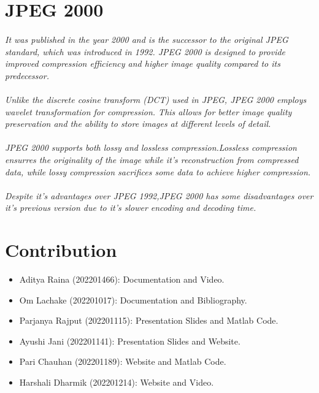 \documentclass[12pt, letterpaper]{article}
\begin{document}
\section{{\color{blue}JPEG 2000}}
\paragraph{}\textit{It was published in the year 2000 and is the successor to the original JPEG standard, which was introduced in 1992. JPEG 2000 is designed to provide improved compression efficiency and higher image quality compared to its predecessor.}
\paragraph{}\textit{ Unlike the discrete cosine transform (DCT) used in JPEG, JPEG 2000 employs wavelet transformation for compression. This allows for better image quality preservation and the ability to store images at different levels of detail.}
\paragraph{}\textit{JPEG 2000 supports both lossy and lossless compression.Lossless compression ensurres the originality of the image while it's reconstruction from compressed data, while lossy compression sacrifices some data to achieve higher compression.}
\paragraph{}\textit{Despite it's advantages over JPEG 1992,JPEG 2000 has some disadvantages over it's previous version due to it's slower encoding and decoding time.}
\section{{\color{blue}Contribution}}
\begin{itemize}
  \item \textup{{\large Aditya Raina (202201466):} Documentation and Video.}
  \item \textup{{\large Om Lachake (202201017):} Documentation and Bibliography.}
  \item \textup{{\large Parjanya Rajput (202201115):} Presentation Slides and Matlab Code.}
  \item \textup{{\large Ayushi Jani (202201141):} Presentation Slides and Website.}
  \item \textup{{\large Pari Chauhan (202201189):} Website and Matlab Code.}
  \item \textup{{\large Harshali Dharmik (202201214):} Website and Video.}

\end{itemize}
\newpage
~\nocite{jaipur,pdf,Penn92,qoura,stanford-dct, reducible2022,baeldung2023,Bonix2018,Yuniblog}


\end{document}
